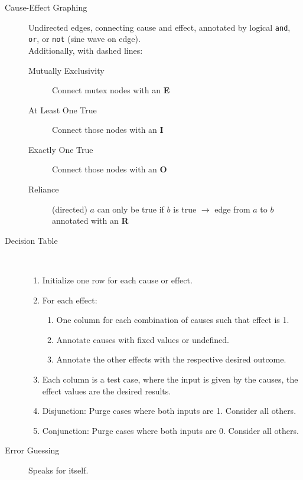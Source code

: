 \begin{description}
	\item[Cause-Effect Graphing] Undirected edges, connecting cause and effect,
	annotated by logical \texttt{and}, \texttt{or}, or \texttt{not} (sine wave on
	edge). \\
	Additionally, with dashed lines:\\
	\begin{description}
		\item[Mutually Exclusivity] Connect mutex nodes with an \textbf{E}
		\item[At Least One True] Connect those nodes with an \textbf{I}
		\item[Exactly One True] Connect those nodes with an \textbf{O}
		\item[Reliance] (directed) $a$ can only be true if $b$ is true $\rightarrow$ edge
		from $a$ to $b$ annotated with an \textbf{R}
	\end{description}
	\item[Decision Table] \ 
	\begin{enumerate}
		\item Initialize one row for each cause or effect.
		\item For each effect: 
		\begin{enumerate}
			\item One column for each combination of causes such that effect is 1.
			\item Annotate causes with fixed values or undefined.
			\item Annotate the other effects with the respective desired outcome.
		\end{enumerate}
		\item Each column is a test case, where the input is given by the causes, the
		effect values are the desired results.
		\item Disjunction: Purge cases where both inputs are 1. Consider all others.
		\item Conjunction: Purge cases where both inputs are 0. Consider all others.
	\end{enumerate}
	\item[Error Guessing] Speaks for itself.
\end{description}

